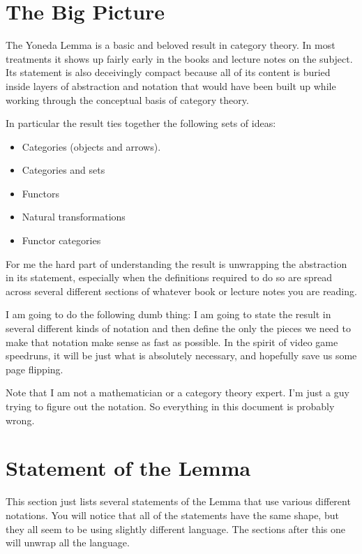 
\section{The Big Picture}

The Yoneda Lemma is a basic and beloved result in category theory. In most treatments it
shows up fairly early in the books and lecture notes on the subject. Its
statement is also deceivingly compact because all of its content is buried inside layers
of abstraction and notation that would have been built up while working through the
conceptual basis of category theory.

In particular the result ties together the following sets of ideas:

\begin{itemize}

\item Categories (objects and arrows).
\item Categories and sets
\item Functors
\item Natural transformations
\item Functor categories

\end{itemize}

\noindent
For me the hard part of understanding the result is unwrapping the abstraction in its statement, especially when the definitions required to do so are spread across several different sections of whatever book or lecture notes you are reading.

I am going to do the following dumb thing: I am going to state the result in several
different kinds of notation and then define the only the pieces we need to make that notation make sense as fast as possible.
In the spirit of video game speedruns, it will be just what is absolutely necessary, and hopefully save us some page flipping.

Note that I am not a mathematician or a category theory expert. I'm just a guy trying to
figure out the notation. So everything in this document is probably wrong.

\section{Statement of the Lemma}

This section just lists several statements of the Lemma that use various different notations. You will notice that all of the statements have the same shape, but they all seem to be using slightly different language. The sections after this one will unwrap all the language.

